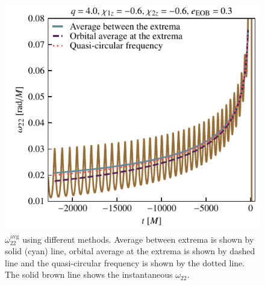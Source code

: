\documentclass[aps,prd,amsmath,floats,floatfix, twocolumn,
superscriptaddress,nofootinbib,showpacs]{revtex4-1}
\newcommand{\avgOmega}{\omega^{\text{avg}}_{22}}
\begin{document}
\begin{figure}[htb]
  \centering
  \includegraphics[width=\columnwidth]{omega22_average}
  \caption{$\avgOmega$ using different methods. Average between
extrema is shown by solid (cyan) line, orbital average at the extrema
is shown by dashed line and the quasi-circular frequency is shown by
the dotted line. The solid brown line shows the instantaneous
$\omega_{22}$.}
  \label{fig:omega22-average}
\end{figure}
\end{document}
